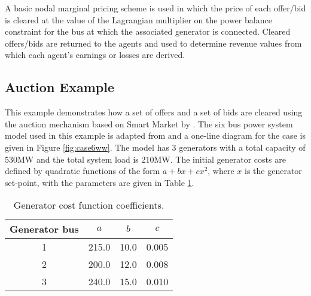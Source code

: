 
A basic nodal marginal pricing scheme is used in which the price of each
offer/bid is cleared at the value of the Lagrangian multiplier on the power
balance constraint for the bus at which the associated generator is connected.
Cleared offers/bids are returned to the agents and used to determine revenue
values from which each agent's earnings or losses are derived.

\subsection{Auction Example}
This example demonstrates how a set of offers and a set of bids are cleared
using the auction mechanism based on Smart Market by .
The six bus power system model used in this example is adapted from
 and a one-line diagram for
the case is given in Figure \ref{fig:case6ww}.  The model has 3 generators
with a total capacity of 530MW and the total system load is 210MW.  The
initial generator costs are defined by quadratic functions of the form $a + bx
+ cx^2$, where $x$ is the generator set-point, with the parameters are given in
Table \ref{tbl:ex_coeffs}.
\begin{table}
\begin{center}
\begin{tabular}{c|c|c|c}
\hline
Generator bus & $a$ & $b$ & $c$ \\
\hline
1 & 215.0 & 10.0 & 0.005 \\
2 & 200.0 & 12.0 & 0.008 \\
3 & 240.0 & 15.0 & 0.010 \\
\hline
\end{tabular}
\end{center}
\caption{Generator cost function coefficients.}
\label{tbl:ex_coeffs}
\end{table}

